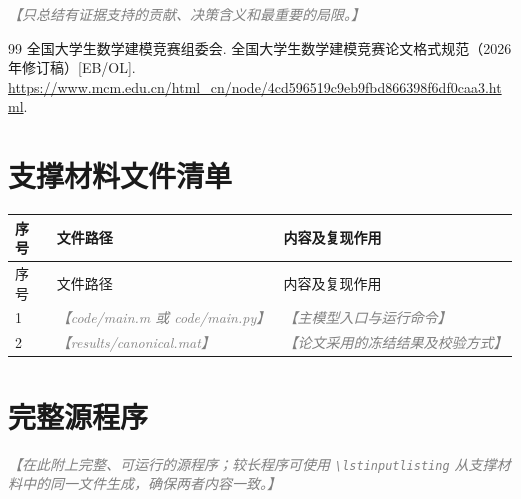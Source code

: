\documentclass[UTF8,zihao=-4,fontset=fandol,a4paper]{ctexart}
\newcommand{\placeholder}[1]{\textcolor{gray}{\textit{【#1】}}}
\begin{document}
\placeholder{只总结有证据支持的贡献、决策含义和最重要的局限。}

\begin{thebibliography}{99}
  全国大学生数学建模竞赛组委会.
  全国大学生数学建模竞赛论文格式规范（2026年修订稿）[EB/OL].
  \url{https://www.mcm.edu.cn/html_cn/node/4cd596519c9eb9fbd866398f6df0caa3.html}.
\end{thebibliography}

\appendix
{}

\section{支撑材料文件清单}

\begin{longtable}{p{}p{}p{}}
  \toprule
  序号 & 文件路径 & 内容及复现作用 \\
  \midrule
  \endfirsthead
  \toprule
  序号 & 文件路径 & 内容及复现作用 \\
  \midrule
  \endhead
  1 & \placeholder{code/main.m 或 code/main.py} & \placeholder{主模型入口与运行命令} \\
  2 & \placeholder{results/canonical.mat} & \placeholder{论文采用的冻结结果及校验方式} \\
  \bottomrule
\end{longtable}

\section{完整源程序}

\placeholder{在此附上完整、可运行的源程序；较长程序可使用 \texttt{\textbackslash lstinputlisting} 从支撑材料中的同一文件生成，确保两者内容一致。}

% 
\end{document}
